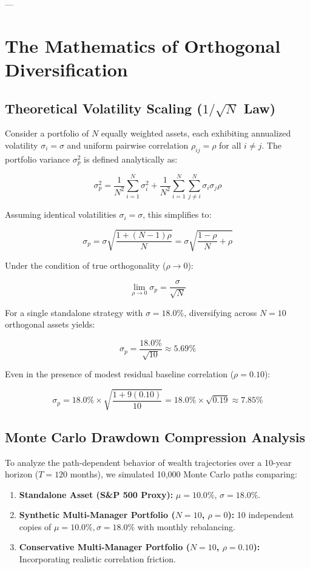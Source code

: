 \documentclass[11pt,a4paper]{article}
\begin{document}
---

\section{The Mathematics of Orthogonal Diversification}

\subsection{Theoretical Volatility Scaling ($1/\sqrt{N}$ Law)}

Consider a portfolio of $N$ equally weighted assets, each exhibiting annualized volatility $\sigma_i = \sigma$ and uniform pairwise correlation $\rho_{ij} = \rho$ for all $i \neq j$. The portfolio variance $\sigma_p^2$ is defined analytically as:

\begin{equation}
\sigma_p^2 = \frac{1}{N^2} \sum_{i=1}^{N} \sigma_i^2 + \frac{1}{N^2} \sum_{i=1}^{N}\sum_{j \neq i}^{N} \sigma_i \sigma_j \rho
\end{equation}

Assuming identical volatilities $\sigma_i = \sigma$, this simplifies to:

\begin{equation}
\sigma_p = \sigma \sqrt{\frac{1 + (N - 1)\rho}{N}} = \sigma \sqrt{\frac{1 - \rho}{N} + \rho}
\end{equation}

Under the condition of true orthogonality ($\rho \to 0$):

\begin{equation}
\lim_{\rho \to 0} \sigma_p = \frac{\sigma}{\sqrt{N}}
\end{equation}

For a single standalone strategy with $\sigma = 18.0\%$, diversifying across $N = 10$ orthogonal assets yields:

$$\sigma_p = \frac{18.0\%}{\sqrt{10}} \approx 5.69\%$$

Even in the presence of modest residual baseline correlation ($\rho = 0.10$):

$$\sigma_p = 18.0\% \times \sqrt{\frac{1 + 9(0.10)}{10}} = 18.0\% \times \sqrt{0.19} \approx 7.85\%$$

\subsection{Monte Carlo Drawdown Compression Analysis}

To analyze the path-dependent behavior of wealth trajectories over a 10-year horizon ($T = 120$ months), we simulated 10,000 Monte Carlo paths comparing:
\begin{enumerate}[leftmargin=1.5em]
    \item \textbf{Standalone Asset (S\&P 500 Proxy):} $\mu = 10.0\%$, $\sigma = 18.0\%$.
    \item \textbf{Synthetic Multi-Manager Portfolio ($N=10$, $\rho=0$):} 10 independent copies of $\mu=10.0\%, \sigma=18.0\%$ with monthly rebalancing.
    \item \textbf{Conservative Multi-Manager Portfolio ($N=10$, $\rho=0.10$):} Incorporating realistic correlation friction.
\end{enumerate}
\end{document}
